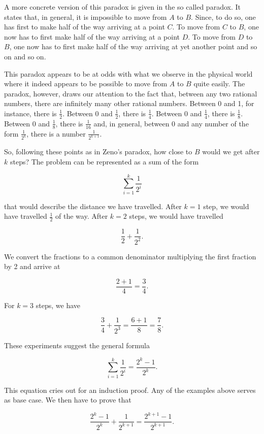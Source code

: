 \documentclass[tikz]{scrreprt}
\begin{document}
A more concrete version of this paradox is given in
the so called  paradox.
It states that, in general, it is impossible 
to move from $A$ to $B$.
Since, to do so, one has first to make half of the way
arriving at a point $C$. To move from $C$ to $B$,
one now has to first make half of the way
arriving at a point $D$. To move from $D$ to $B$,
one now has to first make half of the way
arriving at yet another point and so on and so on.

This paradox appears to be at odds with 
what we observe in the physical world where it
indeed appears to be possible to move from
$A$ to $B$ quite easily.
The paradox, however, draws our attention to
the fact that, between any two rational numbers,
there are infinitely many other rational numbers.
Between 0 and 1, for instance, there is $\frac{1}{2}$.
Between 0 and $\frac{1}{2}$, there is $\frac{1}{4}$.
Between 0 and $\frac{1}{4}$, there is $\frac{1}{8}$.
Between 0 and $\frac{1}{8}$, there is $\frac{1}{16}$
and, in general, between 0 and any number of the form
$\frac{1}{2^k}$, there is a number $\frac{1}{2^{k+1}}$.

So, following these points as in Zeno's paradox,
how close to $B$ would we get after $k$ steps?
The problem can be represented as a sum of the form

\[
\sum_{i=1}^k{\frac{1}{2^i}}
\]

that would describe the distance we have travelled.
After $k=1$ step, we would have travelled
$\frac{1}{2}$ of the way. 
After $k=2$ steps, we would have travelled

\[
\frac{1}{2} + \frac{1}{2^2}.
\]

We convert the fractions to a common denominator
multiplying the first fraction by 2 and arrive at

\[
\frac{2+1}{4} = \frac{3}{4}. 
\]

For $k=3$ steps, we have

\[
\frac{3}{4} + \frac{1}{2^3} =
\frac{6+1}{8} = \frac{7}{8}.
\]

These experiments suggest the general formula

\begin{equation}\label{eq:Zeno2}
\sum_{i=1}^k{\frac{1}{2^i}} =
\frac{2^k - 1}{2^k}.
\end{equation}

This equation cries out for an induction proof.
Any of the examples above serves as base case.
We then have to prove that

\begin{equation}
\frac{2^k - 1}{2^k} + \frac{1}{2^{k+1}} = 
\frac{2^{k+1}-1}{2^{k+1}}.
\end{equation}
\end{document}
